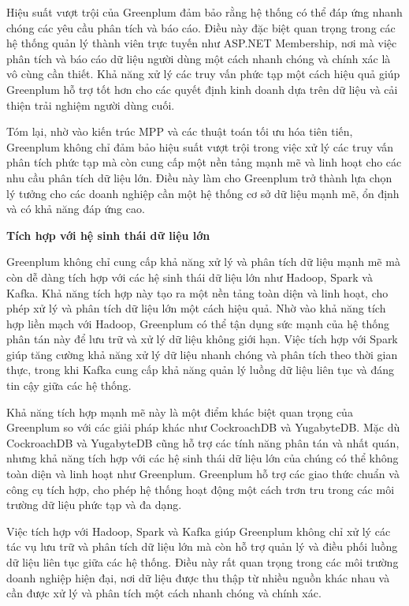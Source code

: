 \documentclass[14pt]{article}
\begin{document}
Hiệu suất vượt trội của Greenplum đảm bảo rằng hệ thống có thể đáp ứng nhanh chóng các yêu cầu phân tích và báo cáo. Điều này đặc biệt quan trọng trong các hệ thống quản lý thành viên trực tuyến như ASP.NET Membership, nơi mà việc phân tích và báo cáo dữ liệu người dùng một cách nhanh chóng và chính xác là vô cùng cần thiết. Khả năng xử lý các truy vấn phức tạp một cách hiệu quả giúp Greenplum hỗ trợ tốt hơn cho các quyết định kinh doanh dựa trên dữ liệu và cải thiện trải nghiệm người dùng cuối.

Tóm lại, nhờ vào kiến trúc MPP và các thuật toán tối ưu hóa tiên tiến, Greenplum không chỉ đảm bảo hiệu suất vượt trội trong việc xử lý các truy vấn phân tích phức tạp mà còn cung cấp một nền tảng mạnh mẽ và linh hoạt cho các nhu cầu phân tích dữ liệu lớn. Điều này làm cho Greenplum trở thành lựa chọn lý tưởng cho các doanh nghiệp cần một hệ thống cơ sở dữ liệu mạnh mẽ, ổn định và có khả năng đáp ứng cao.



\textbf{Tích hợp với hệ sinh thái dữ liệu lớn}

Greenplum không chỉ cung cấp khả năng xử lý và phân tích dữ liệu mạnh mẽ mà còn dễ dàng tích hợp với các hệ sinh thái dữ liệu lớn như Hadoop, Spark và Kafka. Khả năng tích hợp này tạo ra một nền tảng toàn diện và linh hoạt, cho phép xử lý và phân tích dữ liệu lớn một cách hiệu quả. Nhờ vào khả năng tích hợp liền mạch với Hadoop, Greenplum có thể tận dụng sức mạnh của hệ thống phân tán này để lưu trữ và xử lý dữ liệu không giới hạn. Việc tích hợp với Spark giúp tăng cường khả năng xử lý dữ liệu nhanh chóng và phân tích theo thời gian thực, trong khi Kafka cung cấp khả năng quản lý luồng dữ liệu liên tục và đáng tin cậy giữa các hệ thống.

Khả năng tích hợp mạnh mẽ này là một điểm khác biệt quan trọng của Greenplum so với các giải pháp khác như CockroachDB và YugabyteDB. Mặc dù CockroachDB và YugabyteDB cũng hỗ trợ các tính năng phân tán và nhất quán, nhưng khả năng tích hợp với các hệ sinh thái dữ liệu lớn của chúng có thể không toàn diện và linh hoạt như Greenplum. Greenplum hỗ trợ các giao thức chuẩn và công cụ tích hợp, cho phép hệ thống hoạt động một cách trơn tru trong các môi trường dữ liệu phức tạp và đa dạng.

Việc tích hợp với Hadoop, Spark và Kafka giúp Greenplum không chỉ xử lý các tác vụ lưu trữ và phân tích dữ liệu lớn mà còn hỗ trợ quản lý và điều phối luồng dữ liệu liên tục giữa các hệ thống. Điều này rất quan trọng trong các môi trường doanh nghiệp hiện đại, nơi dữ liệu được thu thập từ nhiều nguồn khác nhau và cần được xử lý và phân tích một cách nhanh chóng và chính xác.
\end{document}
